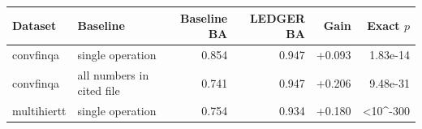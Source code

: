 \begin{tabular}{llrrrr}
\toprule
Dataset & Baseline & Baseline BA & LEDGER BA & Gain & Exact $p$ \\
\midrule
convfinqa & single operation & 0.854 & 0.947 & +0.093 & 1.83e-14 \\
convfinqa & all numbers in cited file & 0.741 & 0.947 & +0.206 & 9.48e-31 \\
multihiertt & single operation & 0.754 & 0.934 & +0.180 & <10^{-300} \\
\bottomrule
\end{tabular}
